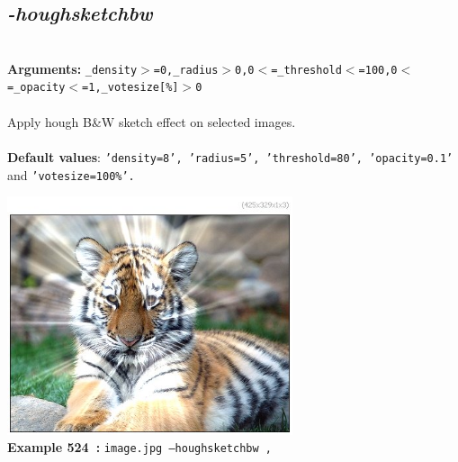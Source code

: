 \documentclass[a4paper,11pt,twoside]{book}
\begin{document}
\subsection{\emph{-houghsketchbw} }\vspace*{-0.5em}
~\\\textbf{Arguments: } 
{\small \texttt{\_density$>$=0,\_radius$>$0,0$<$=\_threshold$<$=100,0$<$=\_opacity$<$=1,\_votesize[\%]$>$0}}\\~\\
Apply hough B\&W sketch effect on selected images.
~\\~\\\textbf{Default values}: {\small \texttt{'density=8', 'radius=5', 'threshold=80', 'opacity=0.1'} and \texttt{'votesize=100\%'.}}
\begin{center}\includegraphics[keepaspectratio=true,height=7cm,width=\textwidth]{img/gmic_def524.jpg}\\
{\footnotesize \textbf{Example 524~:} \texttt{image.jpg --houghsketchbw ,}}
\end{center}
\end{document}
